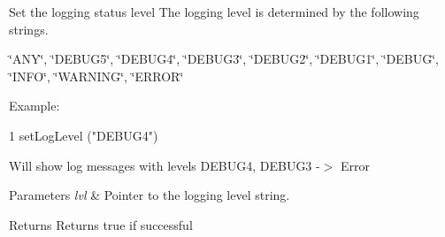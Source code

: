 Set the logging status level The logging level is determined by the following strings. 

\char`\"{}\+A\+N\+Y\char`\"{}, \char`\"{}\+D\+E\+B\+U\+G5\char`\"{}, \char`\"{}\+D\+E\+B\+U\+G4\char`\"{}, \char`\"{}\+D\+E\+B\+U\+G3\char`\"{}, \char`\"{}\+D\+E\+B\+U\+G2\char`\"{}, \char`\"{}\+D\+E\+B\+U\+G1\char`\"{}, \char`\"{}\+D\+E\+B\+U\+G\char`\"{}, \char`\"{}\+I\+N\+F\+O\char`\"{}, \char`\"{}\+W\+A\+R\+N\+I\+N\+G\char`\"{}, \char`\"{}\+E\+R\+R\+O\+R\char`\"{}

Example\+:
\begin{DoxyCode}
1 setLogLevel ("DEBUG4") 
\end{DoxyCode}


Will show log messages with levels D\+E\+B\+U\+G4, D\+E\+B\+U\+G3 -\/$>$ Error


\begin{DoxyParams}{Parameters}
{\em lvl} & Pointer to the logging level string. \\
\hline
\end{DoxyParams}
\begin{DoxyReturn}{Returns}
Returns true if successful 
\end{DoxyReturn}
